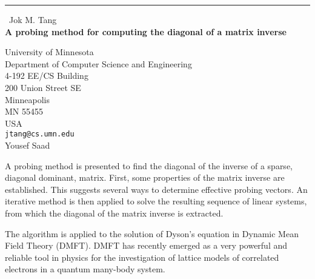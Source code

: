 \documentclass{report}
\begin{document}
\begin{center}
\rule{6in}{1pt} \
{\large Jok M. Tang \\
{\bf A probing method for computing the diagonal of a matrix inverse}}

University of Minnesota \\ Department of Computer Science and Engineering \\ 4-192 EE/CS Building \\ 200 Union Street SE \\ Minneapolis \\ MN 55455 \\ USA
\\
{\tt jtang@cs.umn.edu}\\
Yousef Saad\end{center}

A probing method is presented to find the diagonal of the inverse of a
sparse, diagonal dominant, matrix. First, some properties of the matrix
inverse are established. This suggests several ways to
determine effective probing vectors. An iterative method is then applied
to solve the resulting sequence of linear systems, from which the
diagonal of the matrix inverse is extracted.

The algorithm is applied to the solution of Dyson's equation in Dynamic
Mean Field Theory (DMFT). DMFT has recently emerged as a very powerful
and reliable tool in physics for the investigation of lattice models of
correlated electrons in a quantum many-body system.
\end{document}

